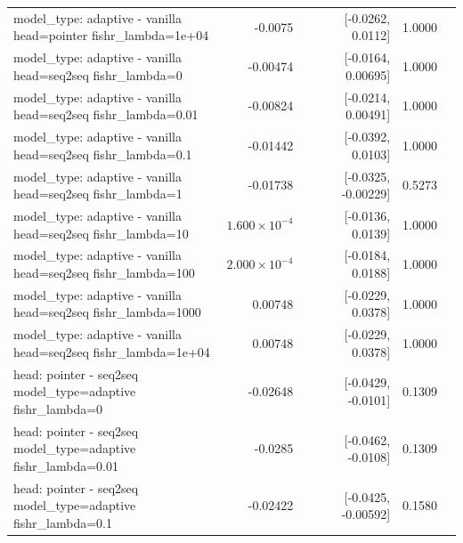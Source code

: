 \documentclass[10pt]{article}
\makeatletter
\newcommand{\stackcell}[1]{\begin{tabular}[t]{@{}l@{}}#1\end{tabular}}
\makeatother
\begin{document}
{\begin{longtable}{lrrrl}
\stackcell{model\_type: adaptive - vanilla\\\footnotesize head=pointer fishr\_lambda=1e+04 } & -0.0075 & [-0.0262, 0.0112] & 1.0000 & \\
\stackcell{model\_type: adaptive - vanilla\\\footnotesize head=seq2seq fishr\_lambda=0 } & -0.00474 & [-0.0164, 0.00695] & 1.0000 & \\
\stackcell{model\_type: adaptive - vanilla\\\footnotesize head=seq2seq fishr\_lambda=0.01 } & -0.00824 & [-0.0214, 0.00491] & 1.0000 & \\
\stackcell{model\_type: adaptive - vanilla\\\footnotesize head=seq2seq fishr\_lambda=0.1 } & -0.01442 & [-0.0392, 0.0103] & 1.0000 & \\
\stackcell{model\_type: adaptive - vanilla\\\footnotesize head=seq2seq fishr\_lambda=1 } & -0.01738 & [-0.0325, -0.00229] & 0.5273 & \\
\stackcell{model\_type: adaptive - vanilla\\\footnotesize head=seq2seq fishr\_lambda=10 } & $1.600\times10^{-4}$ & [-0.0136, 0.0139] & 1.0000 & \\
\stackcell{model\_type: adaptive - vanilla\\\footnotesize head=seq2seq fishr\_lambda=100 } & $2.000\times10^{-4}$ & [-0.0184, 0.0188] & 1.0000 & \\
\stackcell{model\_type: adaptive - vanilla\\\footnotesize head=seq2seq fishr\_lambda=1000 } & 0.00748 & [-0.0229, 0.0378] & 1.0000 & \\
\stackcell{model\_type: adaptive - vanilla\\\footnotesize head=seq2seq fishr\_lambda=1e+04 } & 0.00748 & [-0.0229, 0.0378] & 1.0000 & \\
\stackcell{head: pointer - seq2seq\\\footnotesize model\_type=adaptive fishr\_lambda=0 } & -0.02648 & [-0.0429, -0.0101] & 0.1309 & \\
\stackcell{head: pointer - seq2seq\\\footnotesize model\_type=adaptive fishr\_lambda=0.01 } & -0.0285 & [-0.0462, -0.0108] & 0.1309 & \\
\stackcell{head: pointer - seq2seq\\\footnotesize model\_type=adaptive fishr\_lambda=0.1 } & -0.02422 & [-0.0425, -0.00592] & 0.1580 & \\

\end{longtable}}
\end{document}
